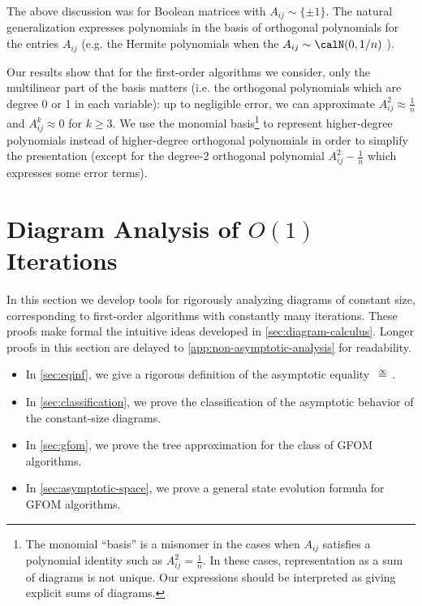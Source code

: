 \documentclass[12pt]{article}
\newcommand{\eqinf}{\,\overset{\infty}{=}\,}
\begin{document}
The above discussion was for Boolean matrices with $A_{ij} \sim \{\pm 1\}$.
The natural generalization expresses polynomials in the basis of orthogonal polynomials for the entries $A_{ij}$
(e.g. the Hermite polynomials when the $A_{ij} \sim \calN(0,1/n)$ \cite[Section 3.2]{montanari2022equivalence}). 

Our results show that for the first-order algorithms we consider,
only the multilinear part of the basis matters
(i.e. the orthogonal polynomials which are degree 0 or 1 in each variable):
up to negligible error, we can approximate $A_{ij}^2 \approx \frac 1n$
and $A_{ij}^k \approx 0$ for $k \geq 3$. We use the monomial basis\footnote{
The monomial ``basis'' is a misnomer in the cases when $A_{ij}$ satisfies a polynomial identity
such as $A_{ij}^2 = \frac{1}{n}$.
In these cases, representation as a sum of diagrams is not unique. Our expressions should be interpreted as giving explicit sums of diagrams.} to represent higher-degree
polynomials instead of higher-degree orthogonal polynomials in order to simplify the presentation (except for the degree-2 orthogonal polynomial $A_{ij}^2 - \frac{1}{n}$ which expresses some error terms).
 
\section{Diagram Analysis of \texorpdfstring{$O(1)$}{O(1)} Iterations}
\label{sec:combinatorial}

In this section we develop tools for rigorously analyzing diagrams of constant size,
corresponding to first-order algorithms with constantly
many iterations. These proofs make formal the intuitive ideas developed in \cref{sec:diagram-calculus}.
Longer proofs in this section are delayed to \cref{app:non-asymptotic-analysis} for readability.


\begin{itemize}
    \item In \cref{sec:eqinf}, we give a rigorous definition of the asymptotic equality $\eqinf$.
    \item In \cref{sec:classification}, we prove the classification of
    the asymptotic behavior of the constant-size diagrams.
    \item In \cref{sec:gfom}, we prove the tree approximation
    for the class of GFOM algorithms.
    \item In \cref{sec:asymptotic-space}, we prove a general state evolution formula for GFOM algorithms.
\end{itemize}
\end{document}
